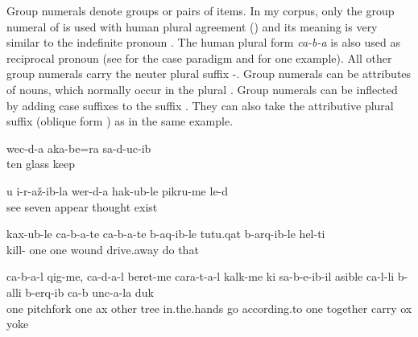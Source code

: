 Group numerals denote groups or pairs of items. In my corpus, only the group numeral of   is used with human plural agreement () and its meaning is very similar to the indefinite pronoun . The human plural form \textit{ca-b-a} is also used as reciprocal pronoun (see  for the case paradigm and   for one example). All other group numerals carry the neuter plural suffix  -. Group numerals can be attributes of nouns, which normally occur in the plural . Group numerals can be inflected by adding case suffixes to the suffix  . They can also take the attributive plural suffix  (oblique form ) as in the same example.

\ea\label{ex:thedoctortriedtenpairsofglasses}
\gll	wec{\ej}-d-a	{\eppl}a{\pha}{\paaf}k{\lmk}a-be=ra	sa-d-uc-ib\\
	ten	glass	keep\\
\glt	{}
\z

\ea\label{ex:afterIsawyoumanythoughtsarose}
\gll	u	{\paaf}i-r-až-ib-la\parn{,}	wer-d-a	hak{\ej}-ub-le	pikru-me	le-d\\
		see	seven	appear	thought	exist\\
\glt	{}
\z

\ea\label{ex:killingsomewoundingothers}
\gll	kax-ub-le	ca-b-a-te	ca-b-a-te	b-a{\pha}q-ib-le	t{\ej}ut{\ej}u.q{\ej}a{\pha}t{\ej}	b-arq{\ej}-ib-le	hel-t{\lmk}i\\
	kill-	one		one 	wound		drive.away	do	that\\
\glt	{}
\z

\ea\label{ex:somepeopletookpitchforks}
\gll	ca-b-a-l	q{\ej}ig-me,	ca-d-a-l	beret-me	cara-t-a-l	k{\lmk}alk-me	k{\lab}i	sa-b-e{\vuvfr}-ib-il	{\phfr}a{\pha}sible	ca-l-li	b-alli	b-erq{\lmk}-ib	ca-b	unc-a-la	duk{\ej}\\
	one	pitchfork	one	ax	other	tree	in.the.hands	go	according.to	one	\tsc{n-}together	carry		ox	yoke\\
\glt	{}
\z



